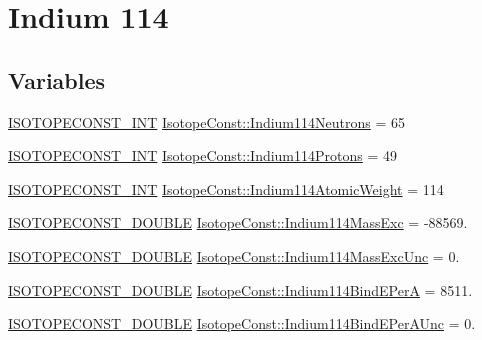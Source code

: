 \hypertarget{group___isotope_const-_indium-_in114}{}\section{Indium 114}
\label{group___isotope_const-_indium-_in114}
\subsection*{Variables}
\begin{DoxyCompactItemize}
\item 
\mbox{\hyperlink{group___isotope_const-_macros_ga5f18360b3e99483a35c32d789e62621c}{I\+S\+O\+T\+O\+P\+E\+C\+O\+N\+S\+T\+\_\+\+I\+NT}} \mbox{\hyperlink{group___isotope_const-_indium-_in114_ga2830421dcc9dc11bc365dfbfe020a01f}{Isotope\+Const\+::\+Indium114\+Neutrons}} = 65
\item 
\mbox{\hyperlink{group___isotope_const-_macros_ga5f18360b3e99483a35c32d789e62621c}{I\+S\+O\+T\+O\+P\+E\+C\+O\+N\+S\+T\+\_\+\+I\+NT}} \mbox{\hyperlink{group___isotope_const-_indium-_in114_ga3c3183d872328eca864b11eed5d0934d}{Isotope\+Const\+::\+Indium114\+Protons}} = 49
\item 
\mbox{\hyperlink{group___isotope_const-_macros_ga5f18360b3e99483a35c32d789e62621c}{I\+S\+O\+T\+O\+P\+E\+C\+O\+N\+S\+T\+\_\+\+I\+NT}} \mbox{\hyperlink{group___isotope_const-_indium-_in114_gab8254ad61f1419686ec9d463ab089908}{Isotope\+Const\+::\+Indium114\+Atomic\+Weight}} = 114
\item 
\mbox{\hyperlink{group___isotope_const-_macros_ga8f45a7272ce02c0b4c65c44636ed719a}{I\+S\+O\+T\+O\+P\+E\+C\+O\+N\+S\+T\+\_\+\+D\+O\+U\+B\+LE}} \mbox{\hyperlink{group___isotope_const-_indium-_in114_gaac4219dadf372e922250af01a0a07a3f}{Isotope\+Const\+::\+Indium114\+Mass\+Exc}} = -\/88569.
\item 
\mbox{\hyperlink{group___isotope_const-_macros_ga8f45a7272ce02c0b4c65c44636ed719a}{I\+S\+O\+T\+O\+P\+E\+C\+O\+N\+S\+T\+\_\+\+D\+O\+U\+B\+LE}} \mbox{\hyperlink{group___isotope_const-_indium-_in114_ga98b4c570a96e065a4a5c1f398226f260}{Isotope\+Const\+::\+Indium114\+Mass\+Exc\+Unc}} = 0.
\item 
\mbox{\hyperlink{group___isotope_const-_macros_ga8f45a7272ce02c0b4c65c44636ed719a}{I\+S\+O\+T\+O\+P\+E\+C\+O\+N\+S\+T\+\_\+\+D\+O\+U\+B\+LE}} \mbox{\hyperlink{group___isotope_const-_indium-_in114_ga25fec607abf71d006d01ea8e908b59b8}{Isotope\+Const\+::\+Indium114\+Bind\+E\+PerA}} = 8511.
\item 
\mbox{\hyperlink{group___isotope_const-_macros_ga8f45a7272ce02c0b4c65c44636ed719a}{I\+S\+O\+T\+O\+P\+E\+C\+O\+N\+S\+T\+\_\+\+D\+O\+U\+B\+LE}} \mbox{\hyperlink{group___isotope_const-_indium-_in114_ga4c52bf276db799de1443c50128a5fc41}{Isotope\+Const\+::\+Indium114\+Bind\+E\+Per\+A\+Unc}} = 0.

\end{DoxyCompactItemize}
